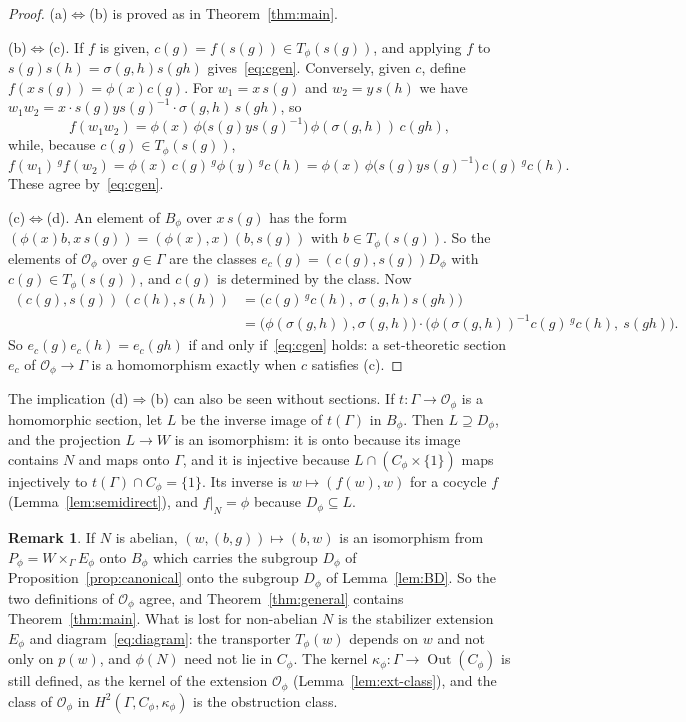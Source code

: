 \documentclass[12pt,letterpaper]{article}
\numberwithin{equation}{section}
\theoremstyle{plain}
\theoremstyle{definition}
\newtheorem{remark}[theorem]{Remark}
\newcommand{\act}[2]{{}^{#1}\!#2}          %
\DeclareMathOperator{\Out}{Out}
\begin{document}
\begin{proof}
(a)$\Leftrightarrow$(b) is proved as in Theorem~\ref{thm:main}.

(b)$\Leftrightarrow$(c). If $f$ is given, $c(g)=f(s(g))\in T_\phi(s(g))$,
and applying $f$ to $s(g)s(h)=\sigma(g,h)s(gh)$ gives~\eqref{eq:cgen}.
Conversely, given $c$, define $f(x\,s(g))=\phi(x)c(g)$. For $w_1=x\,s(g)$
and $w_2=y\,s(h)$ we have
$w_1w_2=x\cdot s(g)ys(g)^{-1}\cdot\sigma(g,h)\,s(gh)$, so
\[
f(w_1w_2)=\phi(x)\,\phi\bigl(s(g)ys(g)^{-1}\bigr)\,\phi(\sigma(g,h))\,c(gh),
\]
while, because $c(g)\in T_\phi(s(g))$,
\[
f(w_1)\,\act{g}{f(w_2)}=\phi(x)\,c(g)\,\act{g}{\phi(y)}\,\act{g}{c(h)}
=\phi(x)\,\phi\bigl(s(g)ys(g)^{-1}\bigr)\,c(g)\,\act{g}{c(h)} .
\]
These agree by~\eqref{eq:cgen}.

(c)$\Leftrightarrow$(d). An element of $B_\phi$ over $x\,s(g)$ has the
form $(\phi(x)b,x\,s(g))=(\phi(x),x)(b,s(g))$ with $b\in T_\phi(s(g))$. So
the elements of $\mathcal{O}_\phi$ over $g\in\Gamma$ are the classes
$e_c(g)=(c(g),s(g))D_\phi$ with $c(g)\in T_\phi(s(g))$, and $c(g)$ is
determined by the class. Now
\begin{align*}
(c(g),s(g))\,(c(h),s(h))&=\bigl(c(g)\,\act{g}{c(h)},\ \sigma(g,h)s(gh)\bigr)\\
&=\bigl(\phi(\sigma(g,h)),\sigma(g,h)\bigr)\cdot
\bigl(\phi(\sigma(g,h))^{-1}c(g)\,\act{g}{c(h)},\ s(gh)\bigr).
\end{align*}
So $e_c(g)e_c(h)=e_c(gh)$ if and only if~\eqref{eq:cgen} holds: a
set-theoretic section $e_c$ of $\mathcal{O}_\phi\to\Gamma$ is a
homomorphism exactly when $c$ satisfies (c).
\end{proof}

The implication (d)$\Rightarrow$(b) can also be seen without sections. If
$t:\Gamma\to\mathcal{O}_\phi$ is a homomorphic section, let $L$ be the
inverse image of $t(\Gamma)$ in $B_\phi$. Then $L\supseteq D_\phi$, and
the projection $L\to W$ is an isomorphism: it is onto because its image
contains $N$ and maps onto $\Gamma$, and it is injective because
$L\cap(C_\phi\times\{1\})$ maps injectively to
$t(\Gamma)\cap C_\phi=\{1\}$. Its inverse is $w\mapsto(f(w),w)$ for a
cocycle $f$ (Lemma~\ref{lem:semidirect}), and $f|_N=\phi$ because
$D_\phi\subseteq L$.

\begin{remark}\label{rem:compare}
If $N$ is abelian, $(w,(b,g))\mapsto(b,w)$ is an isomorphism from
$P_\phi=W\times_\Gamma E_\phi$ onto $B_\phi$ which carries the subgroup
$D_\phi$ of Proposition~\ref{prop:canonical} onto the subgroup $D_\phi$ of
Lemma~\ref{lem:BD}. So the two definitions of $\mathcal{O}_\phi$ agree,
and Theorem~\ref{thm:general} contains Theorem~\ref{thm:main}. What is
lost for non-abelian $N$ is the stabilizer extension $E_\phi$ and
diagram~\eqref{eq:diagram}: the transporter $T_\phi(w)$ depends on $w$ and
not only on $p(w)$, and $\phi(N)$ need not lie in $C_\phi$. The kernel
$\kappa_\phi:\Gamma\to\Out(C_\phi)$ is still defined, as the kernel of the
extension $\mathcal{O}_\phi$ (Lemma~\ref{lem:ext-class}), and the class of
$\mathcal{O}_\phi$ in $H^2(\Gamma,C_\phi,\kappa_\phi)$ is the obstruction
class.
\end{remark}
\end{document}

